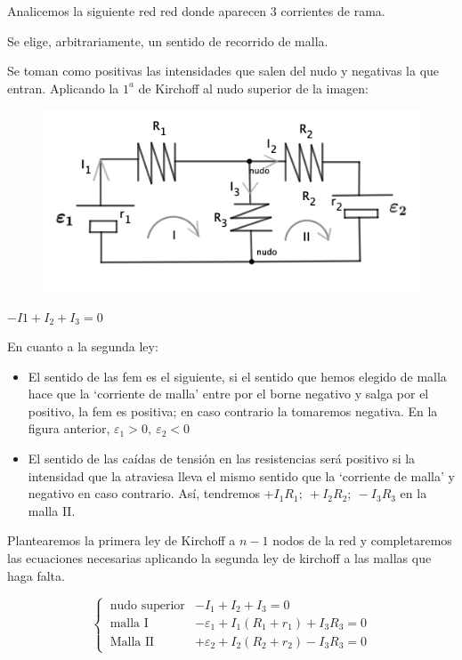 Analicemos la siguiente red red donde aparecen 3 corrientes de rama.

\begin{multicols}{2}
Se elige, arbitrariamente,  un sentido de recorrido de malla.

Se toman como positivas las intensidades que salen del nudo y negativas la que entran. Aplicando la $1^a$ de Kirchoff al nudo superior de la imagen:
	\begin{figure}[H]
	\centering
	\includegraphics[width=.55\textwidth]{imagenes/imagenes25/T25IM08.png}
\end{figure}
\end{multicols}
$-I1+I_2+I_3=0$

En cuanto a la segunda ley:

\begin{itemize}
\item El sentido de las fem es el siguiente, si el sentido que hemos elegido de malla hace que la `corriente de malla' entre por el borne negativo y salga por el positivo, la fem es positiva; en caso contrario la tomaremos negativa. En la figura anterior, $\varepsilon_1>0,\ \varepsilon_2<0$

\item El sentido de las caídas de tensión en las resistencias será positivo si la intensidad que la atraviesa lleva el mismo sentido que la `corriente de malla' y negativo en caso contrario. Así, tendremos $+I_1R_1; \ +I_2 R_2; \ -I_3R_3$ en la malla II. 
\end{itemize}

\vspace{5mm} %
\begin{miparrafodestacado}
	Plantearemos la primera ley de Kirchoff a $n-1$ nodos de la red y completaremos las ecuaciones necesarias aplicando la segunda ley de kirchoff a las mallas que haga falta.
\end{miparrafodestacado}

$$ \begin{cases}
 \ \text{nudo superior} & -I_1+I_2+I_3=0 \\
 \ \text{malla I} & -\varepsilon_1+I_1(R_1+r_1)+I_3R_3=0 \\
 \ \text{Malla II} & +\varepsilon_2+I_2(R_2+r_2)-I_3R_3=0
 \end{cases}$$
 
